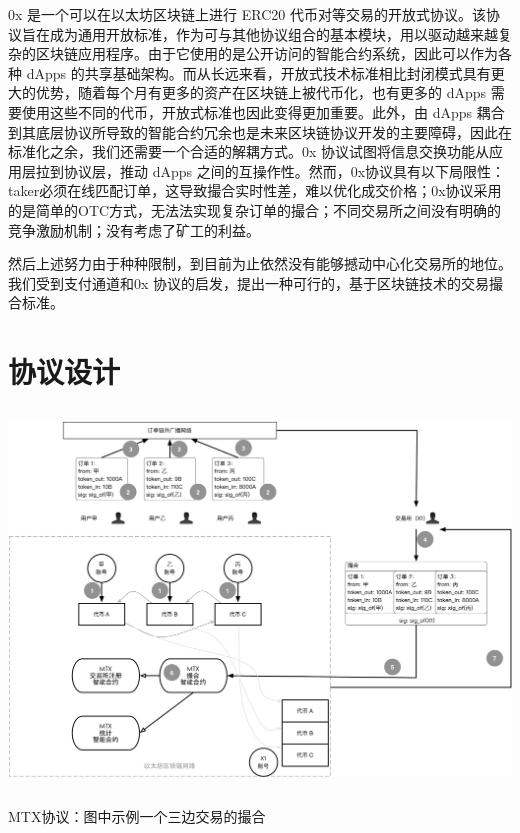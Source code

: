 \documentclass[UTF8,nofonts]{ctexart}
\makeatletter
\newenvironment{figurehere}
  {\def\@captype{figure}}
  {}
\makeatother
\begin{document}
0x \cite{warren20170x} 是一个可以在以太坊区块链上进行 ERC20 代币对等交易的开放式协议。该协议旨在成为通用开放标准，作为可与其他协议组合的基本模块，用以驱动越来越复杂的区块链应用程序。由于它使用的是公开访问的智能合约系统，因此可以作为各种 dApps 的共享基础架构。而从长远来看，开放式技术标准相比封闭模式具有更大的优势，随着每个月有更多的资产在区块链上被代币化，也有更多的 dApps 需要使用这些不同的代币，开放式标准也因此变得更加重要。此外，由 dApps 耦合到其底层协议所导致的智能合约冗余也是未来区块链协议开发的主要障碍，因此在标准化之余，我们还需要一个合适的解耦方式。0x 协议试图将信息交换功能从应用层拉到协议层，推动 dApps 之间的互操作性。然而，0x协议具有以下局限性：taker必须在线匹配订单，这导致撮合实时性差，难以优化成交价格；0x协议采用的是简单的OTC方式，无法法实现复杂订单的撮合；不同交易所之间没有明确的竞争激励机制；没有考虑了矿工的利益。

然后上述努力由于种种限制，到目前为止依然没有能够撼动中心化交易所的地位。我们受到支付通道和0x 协议的启发，提出一种可行的，基于区块链技术的交易撮合标准。


\section{协议设计\label{sec:protocol}}

\begin{center}
\begin{figurehere}
\includegraphics[height=10cm]{images/mtx-protocol.png}
\caption{MTX协议：图中示例一个三边交易的撮合}
\label{fig:mtxprotocol}
\end{figurehere}
\end{center}
\end{document}
